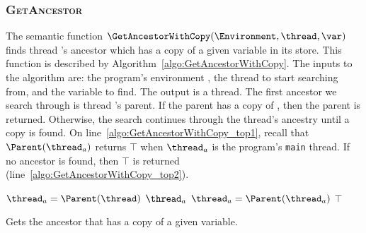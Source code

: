 \subsubsection{\textsc{GetAncestor}}
\label{sec:forec_GetAncestorWithCopy}
The semantic function $\GetAncestorWithCopy(\Environment, \thread, \var)$ 
finds thread \thread{}'s ancestor which has a copy 
of a given variable \var{} in its store. This function is described 
by Algorithm~\ref{algo:GetAncestorWithCopy}. The inputs
to the algorithm are: the program's environment 
\Environment{}, the thread \thread{} to start searching 
from, and the variable \var{} to find. The output is a
thread. The first ancestor we search through is thread 
\thread{}'s parent. If the parent has a copy of \var{}, 
then the parent is returned. Otherwise, the search continues 
through the thread's ancestry until a copy is found. On
line~\ref{algo:GetAncestorWithCopy_top1}, recall that 
$\Parent(\thread_a)$ returns $\top$ when $\thread_a$ is 
the program's \verb$main$ thread. If no ancestor is found, 
then $\top$ is returned (line~\ref{algo:GetAncestorWithCopy_top2}).

\begin{algorithm}[t]
	\begin{algorithmic}[1]
		\Function{$\GetAncestorWithCopy$}{\Environment{}, \thread{}, \var{}}
			\State $\thread_a = \Parent(\thread)$			
								
				\If {$\var \in \Environment[\thread_a]$}
					\State \Return $\thread_a$				
				\EndIf
				\State $\thread_a = \Parent(\thread_a)$		\label{algo:GetAncestorWithCopy_top1}
			\EndWhile
			\State \Return $\top$							\label{algo:GetAncestorWithCopy_top2}
		\EndFunction
	\end{algorithmic}
	
	\caption{Gets the ancestor that has a copy of a given variable.}
	\label{algo:GetAncestorWithCopy}
\end{algorithm}

